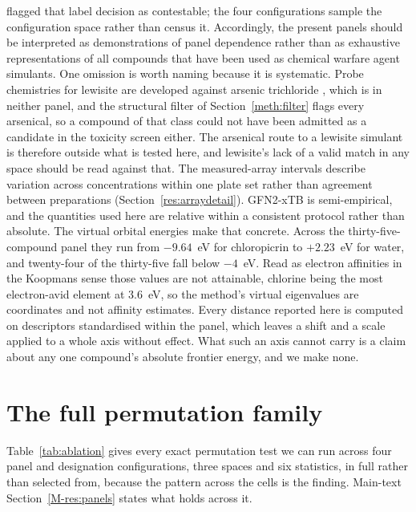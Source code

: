 \documentclass[11pt,a4paper]{article}
\begin{document}
flagged that
label decision as contestable; the four configurations sample the configuration
space rather than census it. Accordingly, the present panels should be
interpreted as demonstrations of panel dependence rather than as exhaustive
representations of all compounds that have been used as chemical warfare agent
simulants. One omission is worth naming because it is systematic. Probe
chemistries for lewisite are developed against arsenic trichloride
\cite{lee2016lewisite}, which is in neither panel, and the structural filter of
Section~\ref{meth:filter} flags every arsenical, so a compound of that class
could not have been admitted as a candidate in the toxicity screen either. The
arsenical route to a lewisite simulant is therefore outside what is tested
here, and lewisite's lack of a valid match in any space should be read against
that. The measured-array intervals describe variation across concentrations within
one plate set rather than agreement between preparations (Section~\ref{res:arraydetail}). GFN2-xTB is
semi-empirical, and the quantities used here are relative within a consistent
protocol rather than absolute. The virtual orbital energies make that concrete.
Across the thirty-five-compound panel they run from $-9.64$~eV for chloropicrin
to $+2.23$~eV for water, and twenty-four of the thirty-five fall below
$-4$~eV. Read as electron affinities in the Koopmans sense those values are not
attainable, chlorine being the most electron-avid element at 3.6~eV, so the
method's virtual eigenvalues are coordinates and not affinity estimates. Every
distance reported here is computed on descriptors standardised within the panel,
which leaves a shift and a scale applied to a whole axis without effect. What
such an axis cannot carry is a claim about any one compound's absolute frontier
energy, and we make none.


\section{The full permutation family}
\label{res:permfull}

Table~\ref{tab:ablation} gives every exact permutation test we can run across
four panel and designation configurations, three spaces and six statistics, in
full rather than selected from, because the pattern across the cells is the
finding. Main-text Section~\ref{M-res:panels} states what holds across it.


\end{document}

